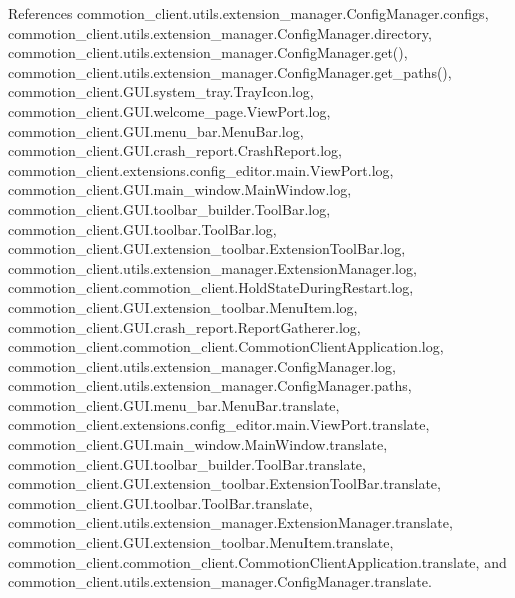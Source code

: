 References commotion\-\_\-client.\-utils.\-extension\-\_\-manager.\-Config\-Manager.\-configs, commotion\-\_\-client.\-utils.\-extension\-\_\-manager.\-Config\-Manager.\-directory, commotion\-\_\-client.\-utils.\-extension\-\_\-manager.\-Config\-Manager.\-get(), commotion\-\_\-client.\-utils.\-extension\-\_\-manager.\-Config\-Manager.\-get\-\_\-paths(), commotion\-\_\-client.\-G\-U\-I.\-system\-\_\-tray.\-Tray\-Icon.\-log, commotion\-\_\-client.\-G\-U\-I.\-welcome\-\_\-page.\-View\-Port.\-log, commotion\-\_\-client.\-G\-U\-I.\-menu\-\_\-bar.\-Menu\-Bar.\-log, commotion\-\_\-client.\-G\-U\-I.\-crash\-\_\-report.\-Crash\-Report.\-log, commotion\-\_\-client.\-extensions.\-config\-\_\-editor.\-main.\-View\-Port.\-log, commotion\-\_\-client.\-G\-U\-I.\-main\-\_\-window.\-Main\-Window.\-log, commotion\-\_\-client.\-G\-U\-I.\-toolbar\-\_\-builder.\-Tool\-Bar.\-log, commotion\-\_\-client.\-G\-U\-I.\-toolbar.\-Tool\-Bar.\-log, commotion\-\_\-client.\-G\-U\-I.\-extension\-\_\-toolbar.\-Extension\-Tool\-Bar.\-log, commotion\-\_\-client.\-utils.\-extension\-\_\-manager.\-Extension\-Manager.\-log, commotion\-\_\-client.\-commotion\-\_\-client.\-Hold\-State\-During\-Restart.\-log, commotion\-\_\-client.\-G\-U\-I.\-extension\-\_\-toolbar.\-Menu\-Item.\-log, commotion\-\_\-client.\-G\-U\-I.\-crash\-\_\-report.\-Report\-Gatherer.\-log, commotion\-\_\-client.\-commotion\-\_\-client.\-Commotion\-Client\-Application.\-log, commotion\-\_\-client.\-utils.\-extension\-\_\-manager.\-Config\-Manager.\-log, commotion\-\_\-client.\-utils.\-extension\-\_\-manager.\-Config\-Manager.\-paths, commotion\-\_\-client.\-G\-U\-I.\-menu\-\_\-bar.\-Menu\-Bar.\-translate, commotion\-\_\-client.\-extensions.\-config\-\_\-editor.\-main.\-View\-Port.\-translate, commotion\-\_\-client.\-G\-U\-I.\-main\-\_\-window.\-Main\-Window.\-translate, commotion\-\_\-client.\-G\-U\-I.\-toolbar\-\_\-builder.\-Tool\-Bar.\-translate, commotion\-\_\-client.\-G\-U\-I.\-extension\-\_\-toolbar.\-Extension\-Tool\-Bar.\-translate, commotion\-\_\-client.\-G\-U\-I.\-toolbar.\-Tool\-Bar.\-translate, commotion\-\_\-client.\-utils.\-extension\-\_\-manager.\-Extension\-Manager.\-translate, commotion\-\_\-client.\-G\-U\-I.\-extension\-\_\-toolbar.\-Menu\-Item.\-translate, commotion\-\_\-client.\-commotion\-\_\-client.\-Commotion\-Client\-Application.\-translate, and commotion\-\_\-client.\-utils.\-extension\-\_\-manager.\-Config\-Manager.\-translate.


